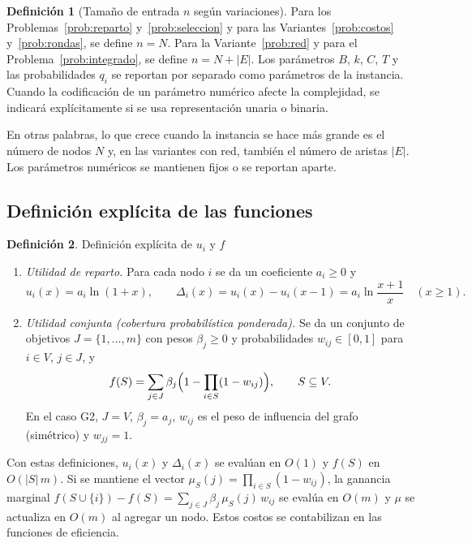 \documentclass[11pt,a4paper]{article}
\theoremstyle{definition}
\newtheorem{definicion}{Definición}[section]
\theoremstyle{plain}
\begin{document}
\begin{definicion}[Tamaño de entrada $n$ según variaciones]\label{def:n}
Para los Problemas~\ref{prob:reparto} y~\ref{prob:seleccion} y para las
Variantes~\ref{prob:costos} y~\ref{prob:rondas}, se define $n=N$. Para la
Variante~\ref{prob:red} y para el Problema~\ref{prob:integrado}, se define
$n=N+|E|$. Los parámetros $B$, $k$, $C$, $T$ y las probabilidades $q_i$ se
reportan por separado como parámetros de la instancia. Cuando la codificación
de un parámetro numérico afecte la complejidad, se indicará explícitamente si
se usa representación unaria o binaria.
\end{definicion}

En otras palabras, lo que crece cuando la instancia se hace más grande es el
número de nodos $N$ y, en las variantes con red, también el número de aristas
$|E|$. Los parámetros numéricos se mantienen fijos o se reportan aparte.

\subsection{Definición explícita de las funciones}

\begin{definicion}\label{sup:explicito} Definición explícita de $u_i$ y $f$
\begin{enumerate}[leftmargin=*,label=(\alph*)]
  \item \emph{Utilidad de reparto.} Para cada nodo $i$ se da un coeficiente
  $a_i\ge0$ y
  \[
    u_i(x)=a_i\ln(1+x),\qquad
    \Delta_i(x)=u_i(x)-u_i(x-1)=a_i\ln\frac{x+1}{x}\quad(x\ge1).
  \]
  \item \emph{Utilidad conjunta (cobertura probabilística ponderada).} Se da un
  conjunto de objetivos $J=\{1,\dots,m\}$ con pesos $\beta_j\ge0$ y
  probabilidades $w_{ij}\in[0,1]$ para $i\in V$, $j\in J$, y
  \[
    f(S)=\sum_{j\in J}\beta_j\Bigl(1-\prod_{i\in S}(1-w_{ij})\Bigr),
    \qquad S\subseteq V.
  \]
  En el caso G2, $J=V$, $\beta_j=a_j$, $w_{ij}$ es el peso de influencia del
  grafo (simétrico) y $w_{jj}=1$.
\end{enumerate}
Con estas definiciones, $u_i(x)$ y $\Delta_i(x)$ se evalúan en $O(1)$ y
$f(S)$ en $O(|S|\,m)$. Si se mantiene el vector
$\mu_S(j)=\prod_{i\in S}(1-w_{ij})$, la ganancia marginal
$f(S\cup\{i\})-f(S)=\sum_{j\in J}\beta_j\,\mu_S(j)\,w_{ij}$ se evalúa en
$O(m)$ y $\mu$ se actualiza en $O(m)$ al agregar un nodo. Estos costos se
contabilizan en las funciones de eficiencia.
\end{definicion}
\end{document}
